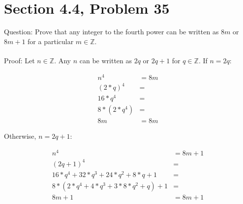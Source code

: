 \documentclass{article}
\begin{document}
\section*{Section 4.4, Problem 35}
Question: Prove that any integer to the fourth power can be written as $8m$ or $8m+1$ for a particular $m\in\mathbb{Z}$.
\\\\
Proof: Let $n\in\mathbb{Z}$. Any $n$ can be written as $2q$ or $2q+1$ for $q\in\mathbb{Z}$. If $n=2q$:
\begin{center}
	\begin{align*}
		n^4&=8m\\
		(2*q)^4&=\\
		16*q^4&=\\
		8*(2*q^4)&=\\
		8m&=8m
	\end{align*}
\end{center}
Otherwise, $n=2q+1$:
\begin{center}
	\begin{align*}
		n^4&=8m+1\\
		(2q+1)^4&=\\
		16*q^4+32*q^3+24*q^2+8*q+1&=\\
		8*(2*q^4+4*q^3+3*8*q^2+q)+1&=\\
		8m+1&=8m+1
	\end{align*}
\end{center}

\clearpage
\header
\graphicspath{ {map_image} }
\begin{figure}[h]
	\centering
\end{figure}
\end{document}
